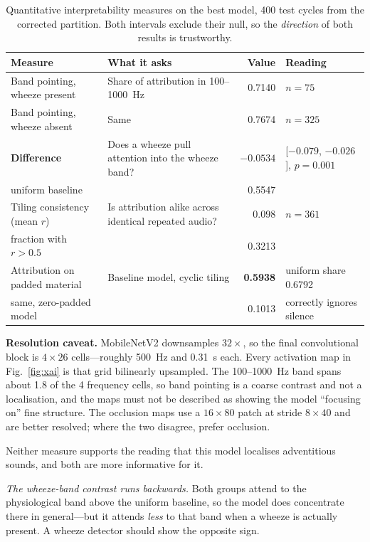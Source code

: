 \documentclass[journal,onecolumn]{IEEEtran}
\newcommand{\best}[1]{\textbf{#1}}
\begin{document}
\begin{table}[!t]
\centering
\caption{Quantitative interpretability measures on the best model, 400 test cycles
from the corrected partition. Both intervals exclude their null, so the
\emph{direction} of both results is trustworthy.}
\label{tab:xaiquant}
\small
\begin{tabular}{llrl}
\toprule
Measure & What it asks & Value & Reading \\
\midrule
Band pointing, wheeze present   & Share of attribution in 100--1000~Hz & 0.7140 & $n = 75$ \\
Band pointing, wheeze absent    & Same & 0.7674 & $n = 325$ \\
\best{Difference}               & Does a wheeze pull attention into the wheeze band? & \best{$-0.0534$} & [$-0.079$, $-0.026$], $p = 0.001$ \\
\quad uniform baseline          & & 0.5547 & \\
\midrule
Tiling consistency (mean $r$)   & Is attribution alike across identical repeated audio? & 0.098 & $n = 361$ \\
\quad fraction with $r > 0.5$   & & 0.3213 & \\
\midrule
Attribution on padded material  & Baseline model, cyclic tiling & \best{0.5938} & uniform share 0.6792 \\
\quad same, zero-padded model   & & 0.1013 & correctly ignores silence \\
\bottomrule
\end{tabular}

\vspace{2pt}
\footnotesize \textbf{Resolution caveat.} MobileNetV2 downsamples $32\times$, so the
final convolutional block is $4\times26$ cells---roughly 500~Hz and 0.31~s each.
Every activation map in Fig.~\ref{fig:xai} is that grid bilinearly upsampled. The
100--1000~Hz band spans about 1.8 of the 4 frequency cells, so band pointing is a
coarse contrast and not a localisation, and the maps must not be described as
showing the model ``focusing on'' fine structure. The occlusion maps use a
$16\times80$ patch at stride $8\times40$ and are better resolved; where the two
disagree, prefer occlusion.
\end{table}

Neither measure supports the reading that this model localises adventitious
sounds, and both are more informative for it.

\emph{The wheeze-band contrast runs backwards.} Both groups attend to the
physiological band above the uniform baseline, so the model does concentrate there
in general---but it attends \emph{less} to that band when a wheeze is actually
present. A wheeze detector should show the opposite sign.
\end{document}
